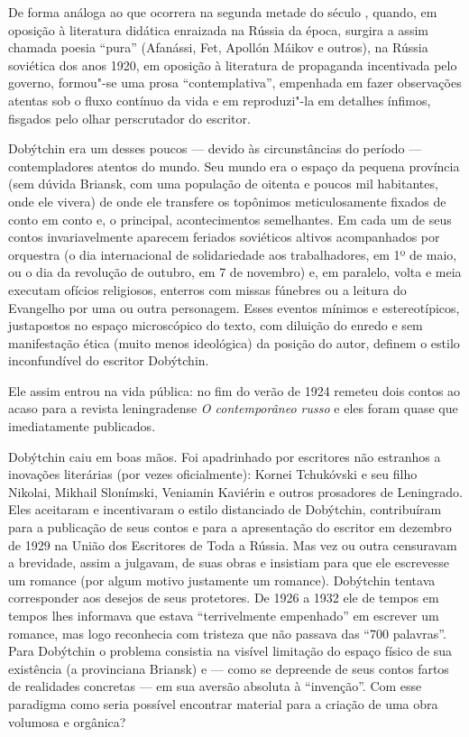 De forma análoga ao que ocorrera na segunda metade do século \scalebox{.8}{XIX},
quando, em oposição à literatura didática enraizada na Rússia da época,
surgira a assim chamada poesia ``pura'' (Afanássi, Fet, Apollón Máikov e
outros), na Rússia soviética dos anos 1920, em oposição à literatura de
propaganda incentivada pelo governo, formou"-se uma prosa
``contemplativa'', empenhada em fazer observações atentas sob o fluxo
contínuo da vida e em reproduzi"-la em detalhes ínfimos, fisgados pelo
olhar perscrutador do escritor.

Dobýtchin era um desses poucos --- devido às circunstâncias do período
--- contempladores atentos do mundo. Seu mundo era o espaço da pequena
província (sem dúvida Briansk, com uma população de oitenta e poucos mil
habitantes, onde ele vivera) de onde ele transfere os topônimos
meticulosamente fixados de conto em conto e, o principal, acontecimentos
semelhantes. Em cada um de seus contos invariavelmente aparecem feriados
soviéticos altivos acompanhados por orquestra (o dia internacional de
solidariedade aos trabalhadores, em 1º de maio, ou o dia da revolução de
outubro, em 7 de novembro) e, em paralelo, volta e meia executam ofícios
religiosos, enterros com missas fúnebres ou a leitura do Evangelho por
uma ou outra personagem. Esses eventos mínimos e estereotípicos,
justapostos no espaço microscópico do texto, com diluição do enredo e
sem manifestação ética (muito menos ideológica) da posição do autor,
definem o estilo inconfundível do escritor Dobýtchin.

Ele assim entrou na vida pública: no fim do verão de 1924 remeteu dois
contos ao acaso para a revista leningradense \emph{O contemporâneo
russo} e eles foram quase que imediatamente publicados.

Dobýtchin caiu em boas mãos. Foi apadrinhado por escritores não
estranhos a inovações literárias (por vezes oficialmente): Kornei
Tchukóvski e seu filho Nikolai, Mikhail Slonímski, Veniamin Kaviérin e
outros prosadores de Leningrado. Eles aceitaram e incentivaram o estilo
distanciado de Dobýtchin, contribuíram para a publicação de seus contos
e para a apresentação do escritor em dezembro de 1929 na União dos
Escritores de Toda a Rússia. Mas vez ou outra censuravam a brevidade,
assim a julgavam, de suas obras e insistiam para que ele escrevesse um
romance (por algum motivo justamente um romance). Dobýtchin tentava
corresponder aos desejos de seus protetores. De 1926 a 1932 ele de
tempos em tempos lhes informava que estava ``terrivelmente empenhado''
em escrever um romance, mas logo reconhecia com tristeza que não passava
das ``700 palavras''. Para Dobýtchin o problema consistia na visível
limitação do espaço físico de sua existência (a provinciana Briansk) e
--- como se depreende de seus contos fartos de realidades concretas ---
em sua aversão absoluta à ``invenção''. Com esse paradigma como seria
possível encontrar material para a criação de uma obra volumosa e
orgânica?


